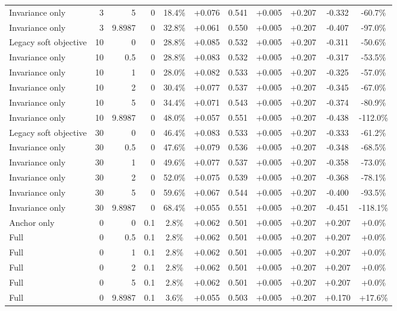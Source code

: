 \begin{table}[htbp]
\begin{tabular}{lrrrccccccc}
Invariance only & 3 & 5 & 0 & 18.4\% & +0.076 & 0.541 & +0.005 & +0.207 & -0.332 & -60.7\% \\
Invariance only & 3 & 9.8987 & 0 & 32.8\% & +0.061 & 0.550 & +0.005 & +0.207 & -0.407 & -97.0\% \\
Legacy soft objective & 10 & 0 & 0 & 28.8\% & +0.085 & 0.532 & +0.005 & +0.207 & -0.311 & -50.6\% \\
Invariance only & 10 & 0.5 & 0 & 28.8\% & +0.083 & 0.532 & +0.005 & +0.207 & -0.317 & -53.5\% \\
Invariance only & 10 & 1 & 0 & 28.0\% & +0.082 & 0.533 & +0.005 & +0.207 & -0.325 & -57.0\% \\
Invariance only & 10 & 2 & 0 & 30.4\% & +0.077 & 0.537 & +0.005 & +0.207 & -0.345 & -67.0\% \\
Invariance only & 10 & 5 & 0 & 34.4\% & +0.071 & 0.543 & +0.005 & +0.207 & -0.374 & -80.9\% \\
Invariance only & 10 & 9.8987 & 0 & 48.0\% & +0.057 & 0.551 & +0.005 & +0.207 & -0.438 & -112.0\% \\
Legacy soft objective & 30 & 0 & 0 & 46.4\% & +0.083 & 0.533 & +0.005 & +0.207 & -0.333 & -61.2\% \\
Invariance only & 30 & 0.5 & 0 & 47.6\% & +0.079 & 0.536 & +0.005 & +0.207 & -0.348 & -68.5\% \\
Invariance only & 30 & 1 & 0 & 49.6\% & +0.077 & 0.537 & +0.005 & +0.207 & -0.358 & -73.0\% \\
Invariance only & 30 & 2 & 0 & 52.0\% & +0.075 & 0.539 & +0.005 & +0.207 & -0.368 & -78.1\% \\
Invariance only & 30 & 5 & 0 & 59.6\% & +0.067 & 0.544 & +0.005 & +0.207 & -0.400 & -93.5\% \\
Invariance only & 30 & 9.8987 & 0 & 68.4\% & +0.055 & 0.551 & +0.005 & +0.207 & -0.451 & -118.1\% \\
Anchor only & 0 & 0 & 0.1 & 2.8\% & +0.062 & 0.501 & +0.005 & +0.207 & +0.207 & +0.0\% \\
Full & 0 & 0.5 & 0.1 & 2.8\% & +0.062 & 0.501 & +0.005 & +0.207 & +0.207 & +0.0\% \\
Full & 0 & 1 & 0.1 & 2.8\% & +0.062 & 0.501 & +0.005 & +0.207 & +0.207 & +0.0\% \\
Full & 0 & 2 & 0.1 & 2.8\% & +0.062 & 0.501 & +0.005 & +0.207 & +0.207 & +0.0\% \\
Full & 0 & 5 & 0.1 & 2.8\% & +0.062 & 0.501 & +0.005 & +0.207 & +0.207 & +0.0\% \\
Full & 0 & 9.8987 & 0.1 & 3.6\% & +0.055 & 0.503 & +0.005 & +0.207 & +0.170 & +17.6\% \\

\end{tabular}
\end{table}
